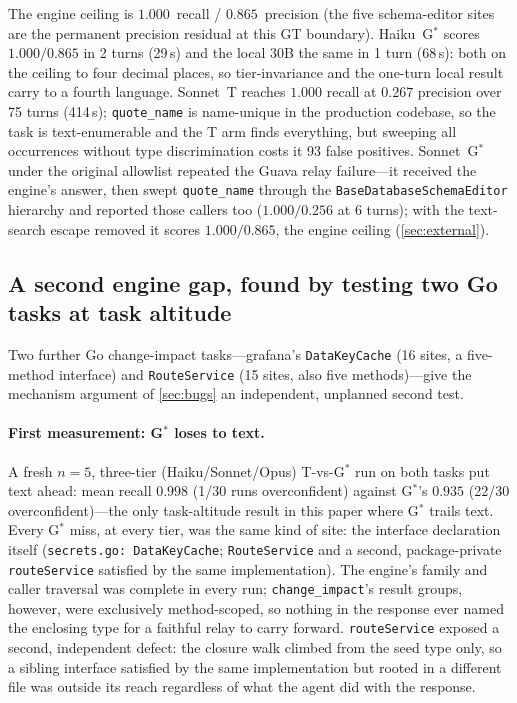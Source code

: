 \documentclass[11pt]{article}
\newcommand{\code}[1]{\texttt{#1}}
\newcommand{\gstar}{G$^{*}$}
\begin{document}
The engine ceiling is $1.000$~recall / $0.865$~precision (the five
schema-editor sites are the permanent precision residual at this GT
boundary). Haiku~\gstar{} scores $1.000/0.865$ in 2 turns (29\,s) and the
local 30B the same in 1 turn (68\,s): both on the ceiling to four decimal
places, so tier-invariance and the one-turn local result carry to a fourth
language. Sonnet~T reaches $1.000$ recall at $0.267$ precision over 75
turns (414\,s); \code{quote\_name} is name-unique in the production
codebase, so the task is text-enumerable and the T arm finds everything,
but sweeping all occurrences without type discrimination costs it 93 false
positives. Sonnet~\gstar{} under the original allowlist repeated the Guava
relay failure---it received the engine's answer, then swept
\code{quote\_name} through the \code{BaseDatabaseSchemaEditor} hierarchy
and reported those callers too ($1.000/0.256$ at 6 turns); with the
text-search escape removed it scores $1.000/0.865$, the engine ceiling
(\cref{sec:external}).

\subsection{A second engine gap, found by testing two Go tasks at task altitude}
\label{sec:go-declaration}

Two further Go change-impact tasks---grafana's \code{DataKeyCache} (16
sites, a five-method interface) and \code{RouteService} (15 sites, also
five methods)---give the mechanism argument of \cref{sec:bugs} an
independent, unplanned second test.

\paragraph{First measurement: \gstar{} loses to text.} A fresh $n=5$,
three-tier (Haiku/Sonnet/Opus) T-vs-\gstar{} run on both tasks put text
ahead: mean recall $0.998$ (1/30 runs overconfident) against \gstar{}'s
$0.935$ (22/30 overconfident)---the only task-altitude result in this paper
where \gstar{} trails text. Every \gstar{} miss, at every tier, was the same
kind of site: the interface declaration itself (\code{secrets.go:%
DataKeyCache}; \code{RouteService} and a second, package-private
\code{routeService} satisfied by the same implementation). The engine's
family and caller traversal was complete in every run; \code{change\_impact}'s
result groups, however, were exclusively method-scoped, so nothing in the
response ever named the enclosing type for a faithful relay to carry
forward. \code{routeService} exposed a second, independent defect: the
closure walk climbed from the seed type only, so a sibling interface
satisfied by the same implementation but rooted in a different file was
outside its reach regardless of what the agent did with the response.
\end{document}
